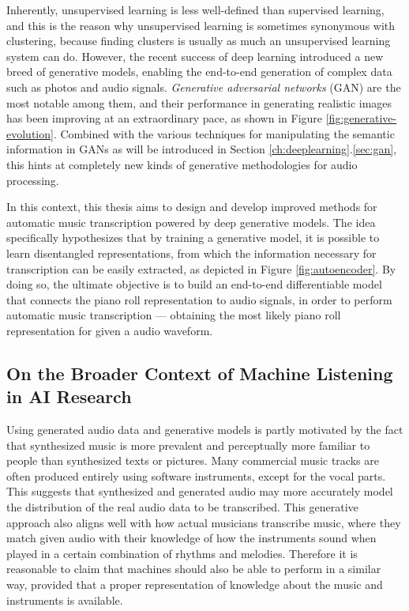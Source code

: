 Inherently, unsupervised learning is less well-defined than supervised learning, and this is the reason why unsupervised learning is sometimes synonymous with clustering, because finding clusters is usually as much an unsupervised learning system can do.
However, the recent success of deep learning introduced a new breed of generative models, enabling the end-to-end generation of complex data such as photos and audio signals.
\emph{Generative adversarial networks} (GAN) \cite{goodfellow2014gan} are the most notable among them, and their performance in generating realistic images has been improving at an extraordinary pace, as shown in Figure \ref{fig:generative-evolution}.
Combined with the various techniques for manipulating the semantic information in GANs as will be introduced in Section \ref{ch:deeplearning}.\ref{sec:gan}, this hints at completely new kinds of generative methodologies for audio processing.


In this context, this thesis aims to design and develop improved methods for automatic music transcription powered by deep generative models.
The idea specifically hypothesizes that by training a generative model, it is possible to learn disentangled representations, from which the information necessary for transcription can be easily extracted, as depicted in Figure \ref{fig:autoencoder}.
By doing so, the ultimate objective is to build an end-to-end differentiable model that connects the piano roll representation to audio signals, in order to perform automatic music transcription --- obtaining the most likely piano roll representation for given a audio waveform.


\subsection{On the Broader Context of Machine Listening in AI Research}

Using generated audio data and generative models is partly motivated by the fact that synthesized music is more prevalent and perceptually more familiar to people than synthesized texts or pictures.
Many commercial music tracks are often produced entirely using software instruments, except for the vocal parts.
This suggests that synthesized and generated audio may more accurately model the distribution of the real audio data to be transcribed.
This generative approach also aligns well with how actual musicians transcribe music, where they match given audio with their knowledge of how the instruments sound when played in a certain combination of rhythms and melodies.
Therefore it is reasonable to claim that machines should also be able to perform in a similar way, provided that a proper representation of knowledge about the music and instruments is available.

